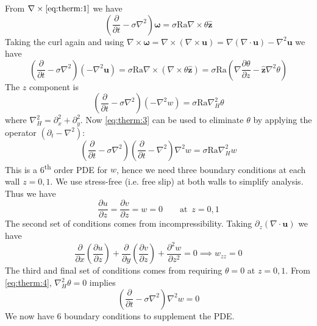 \documentclass{jknotes}
\renewcommand{\u}{\symbf{u}}
\begin{document}
From $\nabla \times \eqref{eq:therm:1}$ we have
\begin{equation}
	\left( \frac{\partial}{\partial t} - \sigma \nabla^2\right)\symbf{\omega}  =
	\sigma \text{Ra} \nabla \times \theta \hat{\symbf{z}}
\end{equation}
Taking the curl again and using $\nabla \times \symbf{\omega} = \nabla \times
(\nabla \times \u) = \nabla (\nabla \cdot \u) - \nabla^2 \u$ we have
\begin{equation}
	\left(\frac{\partial}{\partial t} - \sigma \nabla^2 \right) (-\nabla^2 \u)
	= \sigma \text{Ra} \nabla \times (\nabla \times \theta \hat{\symbf{z}}) =
	\sigma \text{Ra} \left( \nabla \frac{\partial \theta}{\partial z} -
	\hat{\symbf{z}} \nabla^2 \theta \right)
\end{equation}
The $z$ component is
\begin{equation}
	\left(\frac{\partial}{\partial t} - \sigma \nabla^2 \right) (-\nabla^2 w)
	= \sigma \text{Ra} \nabla_H^2 \theta
	\label{eq:therm:4}
\end{equation}
where $\nabla_H^2 = \partial_x^2 + \partial_y^2$. Now \eqref{eq:therm:3} can
be used to eliminate $\theta$ by applying the operator $(\partial_t -
\nabla^2)$:
\begin{equation}
	\left(\frac{\partial}{\partial t} - \sigma \nabla^2
	\right)\left(\frac{\partial}{\partial t} - \nabla^2\right)\nabla^2 w =
	\sigma \text{Ra} \nabla_H^2 w
	\label{eq:therm:5}
\end{equation}
This is a 6\textsuperscript{th} order PDE for $w$, hence we need three
boundary conditions at each wall $z=0,1$. We use stress-free (i.e. free slip)
at both walls to simplify analysis. Thus we have
\begin{equation}
	\frac{\partial u}{\partial z} = \frac{\partial v}{\partial z} = w = 0
	\hspace{2em} \text{at} \,\,\, z=0,1
\end{equation}
The second set of conditions comes from incompressibility. Taking $\partial_z
(\nabla \cdot \u)$ we have
\begin{equation}
	\frac{\partial}{\partial x} \left(\frac{\partial u}{\partial z}\right) +
	\frac{\partial}{\partial y} \left(\frac{\partial v}{\partial z}\right) +
	\frac{\partial^2 w}{\partial z^2} = 0 \implies w_{zz} = 0 
\end{equation}
The third and final set of conditions comes from requiring $\theta = 0$ at
$z=0,1$. From \eqref{eq:therm:4}, $\nabla_H^2 \theta = 0$ implies
\begin{equation}
	\left(\frac{\partial}{\partial t} - \sigma \nabla^2\right) \nabla^2 w = 0
\end{equation}
We now have 6 boundary conditions to supplement the PDE.
\end{document}
